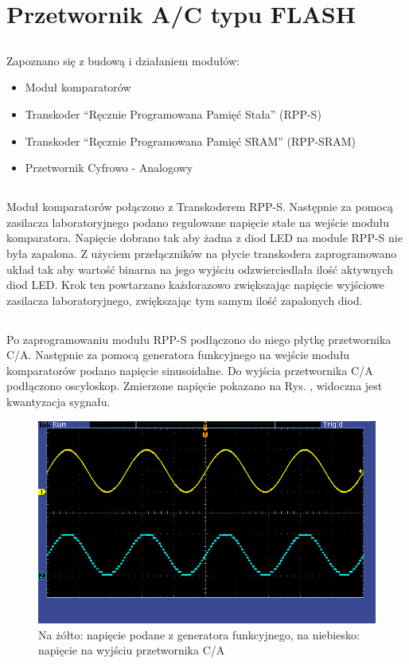 \section{Przetwornik A/C typu FLASH}

\subsection{}
Zapoznano się z budową i działaniem modułów:
\begin{itemize}
    \item Moduł komparatorów
    \item Transkoder ``Ręcznie Programowana Pamięć Stała'' (RPP-S)
    \item Transkoder ``Ręcznie Programowana Pamięć SRAM'' (RPP-SRAM)
    \item Przetwornik Cyfrowo - Analogowy
\end{itemize}

\subsection{}
Moduł komparatorów połączono z Transkoderem RPP-S.
Następnie za pomocą zasilacza laboratoryjnego podano regulowane napięcie stałe na wejście modułu komparatora.
Napięcie dobrano tak aby żadna z diod LED na module RPP-S nie była zapalona.
Z użyciem przełączników na płycie transkodera zaprogramowano układ tak aby wartość binarna na jego wyjściu odzwierciedlała ilość aktywnych diod LED.
Krok ten powtarzano każdorazowo zwiększając napięcie wyjściowe zasilacza laboratoryjnego, zwiększając tym samym ilość zapalonych diod.

\subsection{}
Po zaprogramowaniu modułu RPP-S podłączono do niego płytkę przetwornika C/A.
Następnie za pomocą generatora funkcyjnego na wejście modułu komparatorów podano napięcie sinusoidalne.
Do wyjścia przetwornika C/A podłączono oscyloskop. Zmierzone napięcie pokazano na Rys. , widoczna jest kwantyzacja sygnału.
\begin{figure}[H]
    \centering
    \includegraphics[width=\textwidth]{include/3/1.png}
    \caption{Na żółto: napięcie podane z generatora funkcyjnego, na niebiesko: napięcie na wyjściu przetwornika C/A}
    \label{ca_test}
\end{figure}

